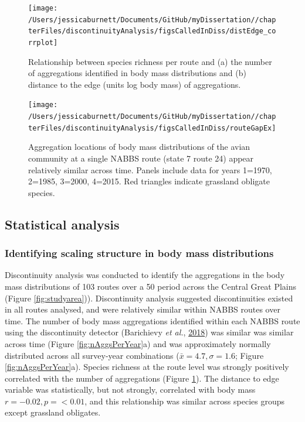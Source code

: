 \documentclass[12pt,twoside,openany]{reedthesis}
\begin{document}
\begin{figure}
\texttt{[image: /Users/jessicaburnett/Documents/GitHub/myDissertation//chapterFiles/discontinuityAnalysis/figsCalledInDiss/distEdge\_corrplot]} \caption{Relationship between species richness per route and (a) the number of aggregations identified in body mass distributions and (b) distance to the edge (units log body mass) of aggregations.}\label{fig:aggEdgeCorrPlot}
\end{figure}
\begin{figure}
\texttt{[image: /Users/jessicaburnett/Documents/GitHub/myDissertation//chapterFiles/discontinuityAnalysis/figsCalledInDiss/routeGapEx]} \caption{Aggregation locations of body mass distributions of the avian community at a single NABBS route (state 7 route 24) appear relatively similar across time. Panels include data for years 1=1970, 2=1985, 3=2000, 4=2015. Red triangles indicate grassland obligate species.}\label{fig:routeGapEx}
\end{figure}
\hypertarget{statistical-analysis-1}{%
\subsection{Statistical analysis}\label{statistical-analysis-1}}

\hypertarget{identifying-scaling-structure-in-body-mass-distributions}{%
\subsubsection{Identifying scaling structure in body mass distributions}\label{identifying-scaling-structure-in-body-mass-distributions}}

Discontinuity analysis was conducted to identify the aggregations in the body mass distributions of 103 routes over a 50 period across the Central Great Plains (Figure \ref{fig:studyarea})). Discontinuity analysis suggested discontinuities existed in all routes analysed, and were relatively similar within NABBS routes over time. The number of body mass aggregations identified within each NABBS route using the discontinuity detector (Barichievy \emph{et al.}, \protect\hyperlink{ref-barichievy2018method}{2018}) was similar was similar across time (Figure \ref{fig:nAggsPerYear}a) and was approximately normally distributed across all survey-year combinations (\(\bar{x} = 4.7, \sigma = 1.6\); Figure \ref{fig:nAggsPerYear}a). Species richness at the route level was strongly positively correlated with the number of aggregations (Figure \ref{fig:aggEdgeCorrPlot}). The distance to edge variable was statistically, but not strongly, correlated with body mass \(r=-0.02, p = <0.01\), and this relationship was similar across species groups except grassland obligates.
\end{document}
